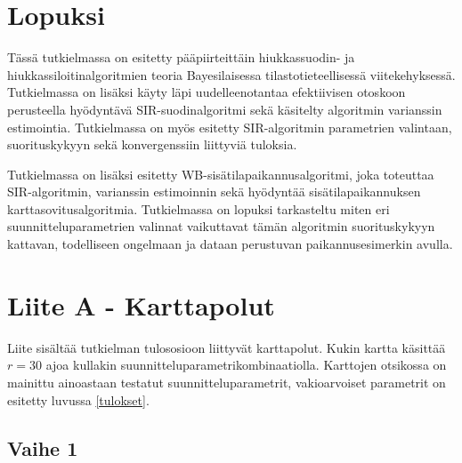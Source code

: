 \documentclass[
  12pt,
  a4paper, twoside]{book}
\begin{document}
\hypertarget{lopuksi}{%
\chapter{Lopuksi}\label{lopuksi}}

Tässä tutkielmassa on esitetty pääpiirteittäin hiukkassuodin- ja hiukkassiloitinalgoritmien teoria Bayesilaisessa tilastotieteellisessä viitekehyksessä. Tutkielmassa on lisäksi käyty läpi uudelleenotantaa efektiivisen otoskoon perusteella hyödyntävä SIR-suodinalgoritmi sekä käsitelty algoritmin varianssin estimointia. Tutkielmassa on myös esitetty SIR-algoritmin parametrien valintaan, suorituskykyyn sekä konvergenssiin liittyviä tuloksia.

Tutkielmassa on lisäksi esitetty WB-sisätilapaikannusalgoritmi, joka toteuttaa SIR-algoritmin, varianssin estimoinnin sekä hyödyntää sisätilapaikannuksen karttasovitusalgoritmia. Tutkielmassa on lopuksi tarkasteltu miten eri suunnitteluparametrien valinnat vaikuttavat tämän algoritmin suorituskykyyn kattavan, todelliseen ongelmaan ja dataan perustuvan paikannusesimerkin avulla.

\hypertarget{liite-a---karttapolut}{%
\chapter*{Liite A - Karttapolut}\label{liite-a---karttapolut}}

Liite sisältää tutkielman tulososioon liittyvät karttapolut. Kukin kartta käsittää \(r=30\) ajoa kullakin suunnitteluparametrikombinaatiolla. Karttojen otsikossa on mainittu ainoastaan testatut suunnitteluparametrit, vakioarvoiset parametrit on esitetty luvussa \ref{tulokset}.

\hypertarget{vaihe-1}{%
\section*{Vaihe 1}\label{vaihe-1}}
\end{document}
